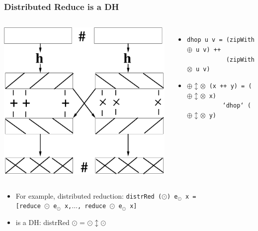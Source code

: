 \documentclass{beamer}
\begin{document}
\begin{frame}[fragile,t]
  \frametitle{Distributed Reduce is a DH}

\begin{columns}
\includegraphics[height=25ex]{Figures/L2/DH}
\vspace{-3ex}
\begin{itemize}
    \item {\tt dhop u v = (zipWith $\oplus$ u v) ++}\\ 
          {\tt~~~~~~~~~~~(zipWith $\otimes$ u v)}
    \item {\tt $\oplus\updownarrow\otimes$ (x ++ y) = ($\oplus\updownarrow\otimes$ x)}\\
          {\tt~~~~~~~~~~`dhop` ($\oplus\updownarrow\otimes$ y)} 
\end{itemize}
\end{columns}

\begin{itemize}
    \item For example, distributed reduction: 
        {\tt distrRed ($\odot$) e$_\odot$ x = }\\
        {\tt [reduce $\odot$ e$_{\odot}$ x,$\ldots$, reduce $\odot$ e$_{\odot}$ x]}
    \item is a DH: distrRed $\odot$ = $\odot\updownarrow\odot$
\end{itemize}

\end{frame}
\end{document}
